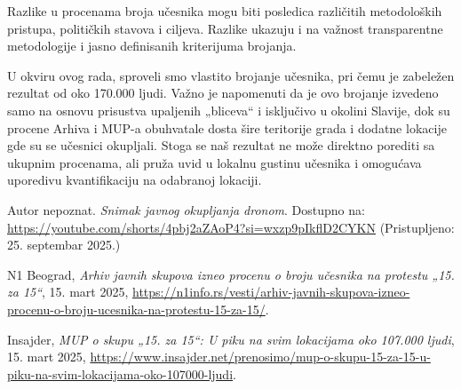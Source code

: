 \documentclass[a4paper,12pt]{article}
\begin{document}
Razlike u procenama broja učesnika mogu biti posledica različitih metodoloških pristupa, političkih stavova i ciljeva. Razlike ukazuju i na važnost transparentne metodologije i jasno definisanih kriterijuma brojanja.

U okviru ovog rada, sproveli smo vlastito brojanje učesnika, pri čemu je zabeležen rezultat od oko 170.000 ljudi. Važno je napomenuti da je ovo brojanje izvedeno samo na osnovu prisustva upaljenih „bliceva“ i isključivo u okolini Slavije, dok su procene Arhiva i MUP-a obuhvatale dosta šire teritorije grada i dodatne lokacije gde su se učesnici okupljali. Stoga se naš rezultat ne može direktno porediti sa ukupnim procenama, ali pruža uvid u lokalnu gustinu učesnika i omogućava uporedivu kvantifikaciju na odabranoj lokaciji.
\newpage
\begin{thebibliography}{9}

	Autor nepoznat. 
	\textit{Snimak javnog okupljanja dronom}. 
	Dostupno na: \url{https://youtube.com/shorts/4pbj2aZAoP4?si=wxzp9pIkflD2CYKN} 
	(Pristupljeno: 25. septembar 2025.)
	
	N1 Beograd,
	\emph{Arhiv javnih skupova izneo procenu o broju učesnika na protestu „15. za 15“},
	15. mart 2025,
	\url{https://n1info.rs/vesti/arhiv-javnih-skupova-izneo-procenu-o-broju-ucesnika-na-protestu-15-za-15/}.

	Insajder,
	\emph{MUP o skupu „15. za 15“: U piku na svim lokacijama oko 107.000 ljudi},
	15. mart 2025,
	\url{https://www.insajder.net/prenosimo/mup-o-skupu-15-za-15-u-piku-na-svim-lokacijama-oko-107000-ljudi}.

	\end{thebibliography}
\end{document}
